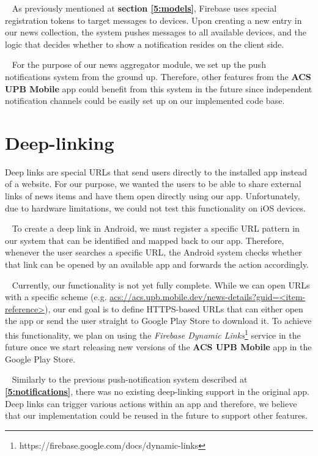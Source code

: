 ~
As previously mentioned at \textbf{section \ref{5:models}}, Firebase uses special registration tokens to target messages to devices. Upon creating a new entry in our news collection, the system pushes messages to all available devices, and the logic that decides whether to show a notification resides on the client side.

~
For the purpose of our news aggregator module, we set up the push notifications system from the ground up. Therefore, other features from the \textbf{ACS UPB Mobile} app could benefit from this system in the future since independent notification channels could be easily set up on our implemented code base.

\section{Deep-linking}

Deep links are special URLs that send users directly to the installed app instead of a website. For our purpose, we wanted the users to be able to share external links of news items and have them open directly using our app. Unfortunately, due to hardware limitations, we could not test this functionality on iOS devices.

~
To create a deep link in Android, we must register a specific URL pattern in our system that can be identified and mapped back to our app. Therefore, whenever the user searches a specific URL, the Android system checks whether that link can be opened by an available app and forwards the action accordingly.

~
Currently, our functionality is not yet fully complete. While we can open URLs with a specific scheme (e.g. \url{acs://acs.upb.mobile.dev/news-details?guid=<item-reference>}), our end goal is to define HTTPS-based URLs that can either open the app or send the user straight to Google Play Store to download it. To achieve this functionality, we plan on using the \textit{Firebase Dynamic Links}\footnote{https://firebase.google.com/docs/dynamic-links} service in the future once we start releasing new versions of the \textbf{ACS UPB Mobile} app in the Google Play Store.

~
Similarly to the previous push-notification system described at \textbf{\ref{5:notifications}}, there was no existing deep-linking support in the original app. Deep links can trigger various actions within an app and therefore, we believe that our implementation could be reused in the future to support other features. 